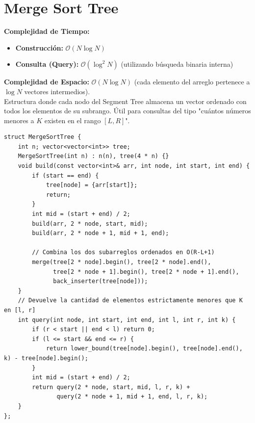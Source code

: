 \documentclass[10pt,twocolumn,letterpaper]{report}
\begin{document}
\section{Merge Sort Tree}
\textbf{Complejidad de Tiempo:}
\begin{itemize}
    \item \textbf{Construcción:} $\mathcal{O}(N \log N)$
    \item \textbf{Consulta (Query):} $\mathcal{O}(\log^2 N)$ (utilizando búsqueda binaria interna)
\end{itemize}
\textbf{Complejidad de Espacio:} $\mathcal{O}(N \log N)$ (cada elemento del arreglo pertenece a $\log N$ vectores intermedios). \\
Estructura donde cada nodo del Segment Tree almacena un vector ordenado con todos los elementos de su subrango. Útil para consultas del tipo "cuántos números menores a $K$ existen en el rango $[L, R]$".
\begin{lstlisting}
struct MergeSortTree {
    int n; vector<vector<int>> tree;
    MergeSortTree(int n) : n(n), tree(4 * n) {}
    void build(const vector<int>& arr, int node, int start, int end) {
        if (start == end) {
            tree[node] = {arr[start]};
            return;
        }
        int mid = (start + end) / 2;
        build(arr, 2 * node, start, mid);
        build(arr, 2 * node + 1, mid + 1, end);
        
        // Combina los dos subarreglos ordenados en O(R-L+1)
        merge(tree[2 * node].begin(), tree[2 * node].end(),
              tree[2 * node + 1].begin(), tree[2 * node + 1].end(),
              back_inserter(tree[node]));
    }
    // Devuelve la cantidad de elementos estrictamente menores que K en [l, r]
    int query(int node, int start, int end, int l, int r, int k) {
        if (r < start || end < l) return 0;
        if (l <= start && end <= r) {
            return lower_bound(tree[node].begin(), tree[node].end(), k) - tree[node].begin();
        }
        int mid = (start + end) / 2;
        return query(2 * node, start, mid, l, r, k) + 
               query(2 * node + 1, mid + 1, end, l, r, k);
    }
};
\end{lstlisting}
\end{document}
